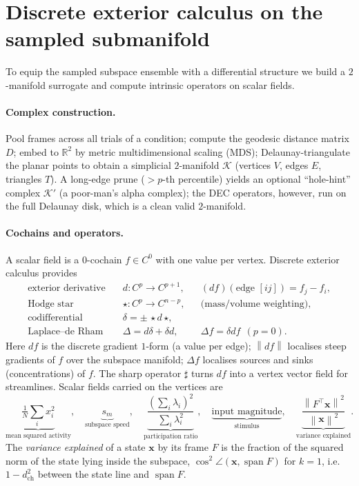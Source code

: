 \documentclass[11pt]{article}
\newcommand{\R}{\mathbb{R}}
\newcommand{\norm}[1]{\left\lVert #1 \right\rVert}
\newcommand{\Span}{\operatorname{span}}
\theoremstyle{definition}
\begin{document}
\section{Discrete exterior calculus on the sampled submanifold}
\label{sec:dec}

To equip the sampled subspace ensemble with a differential structure we build a
$2$-manifold surrogate and compute intrinsic operators on scalar fields.

\paragraph{Complex construction.} Pool frames across all trials of a condition;
compute the geodesic distance matrix $D$; embed to $\R^2$ by metric multidimensional
scaling (MDS); Delaunay-triangulate the planar points to obtain a simplicial
$2$-manifold $\mathcal{K}$ (vertices $V$, edges $E$, triangles $T$). A long-edge
prune ($>\!p$-th percentile) yields an optional ``hole-hint'' complex $\mathcal{K}'$
(a poor-man's alpha complex); the DEC operators, however, run on the full Delaunay
disk, which is a clean valid $2$-manifold.

\paragraph{Cochains and operators.} A scalar field is a $0$-cochain $f\in C^0$ with
one value per vertex. Discrete exterior calculus provides
\begin{align}
\text{exterior derivative} \quad & d: C^p\to C^{p+1}, &&(df)(\text{edge }[ij]) = f_j - f_i,\\
\text{Hodge star} \quad & \star: C^p\to C^{n-p}, && \text{(mass/volume weighting)},\\
\text{codifferential} \quad & \delta = \pm\,\star d\,\star, &&\\
\text{Laplace--de Rham} \quad & \Delta = d\delta + \delta d, && \Delta f = \delta d f \ \ (p{=}0).
\end{align}
Here $df$ is the discrete gradient $1$-form (a value per edge); $\norm{df}$ localises
steep gradients of $f$ over the subspace manifold; $\Delta f$ localises sources and
sinks (concentrations) of $f$. The sharp operator $\sharp$ turns $df$ into a vertex
vector field for streamlines. Scalar fields carried on the vertices are
\begin{equation}
\underbrace{\tfrac1N\sum_i x_i^2}_{\text{mean squared activity}},\quad
\underbrace{s_m}_{\text{subspace speed}},\quad
\underbrace{\frac{(\sum_i\lambda_i)^2}{\sum_i\lambda_i^2}}_{\text{participation ratio}},\quad
\underbrace{\text{input magnitude}}_{\text{stimulus}},\quad
\underbrace{\frac{\norm{F^\top\bm{x}}^2}{\norm{\bm{x}}^2}}_{\text{variance explained}} .
\end{equation}
The \emph{variance explained} of a state $\bm{x}$ by its frame $F$ is the fraction of
the squared norm of the state lying inside the subspace, $\cos^2\!\angle(\bm{x},\Span F)$ for $k=1$, i.e.\
$1-d_{\mathrm{ch}}^2$ between the state line and $\Span F$.
\end{document}
